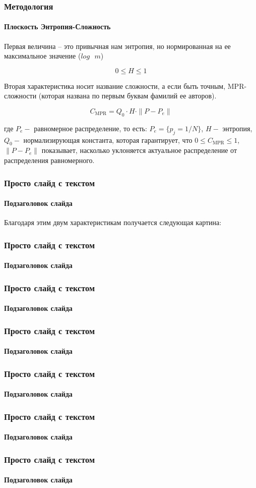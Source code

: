 \documentclass[aspectratio=169]{beamer}
\begin{document}
\begin{frame}
\frametitle{Методология}
\framesubtitle{Плоскость Энтропия-Сложность}
	Первая величина -- это привычная нам энтропия, но нормированная на ее максимальное значение ($log \text{ } m$)
	
	$$
	0 \leq H \leq 1 
	$$
	
	Вторая характеристика носит название сложности, а если быть точным, MPR-сложности (которая названа по первым буквам фамилий ее авторов).

	$$ 
	C_{\text{MPR}} = Q_0 \cdot H \cdot \|P - P_e\| 
	$$
	
	где $P_e - $ равномерное распределение, то есть: $P_e = \{p_j = 1/N\}$, $H - $ энтропия, $Q_0 - $ нормализирующая константа, которая гарантирует, что $0 \leq C_{\text{MPR}} \leq 1$, $\|P - P_e\|$ показывает, насколько уклоняется актуальное распределение от распределения равномерного.
\end{frame}

\begin{frame}
\frametitle{Просто слайд с текстом}
\framesubtitle{Подзаголовок слайда}
	Благодаря этим двум характеристикам получается следующая картина:
\end{frame}

\begin{frame}
\frametitle{Просто слайд с текстом}
\framesubtitle{Подзаголовок слайда}
	\blindtext
\end{frame}

\begin{frame}
\frametitle{Просто слайд с текстом}
\framesubtitle{Подзаголовок слайда}
	\blindtext
\end{frame}

\begin{frame}
\frametitle{Просто слайд с текстом}
\framesubtitle{Подзаголовок слайда}
	\blindtext
\end{frame}

\begin{frame}
\frametitle{Просто слайд с текстом}
\framesubtitle{Подзаголовок слайда}
	\blindtext
\end{frame}

\begin{frame}
\frametitle{Просто слайд с текстом}
\framesubtitle{Подзаголовок слайда}
	\blindtext
\end{frame}

\begin{frame}
\frametitle{Просто слайд с текстом}
\framesubtitle{Подзаголовок слайда}
	\blindtext
\end{frame}
\end{document}
